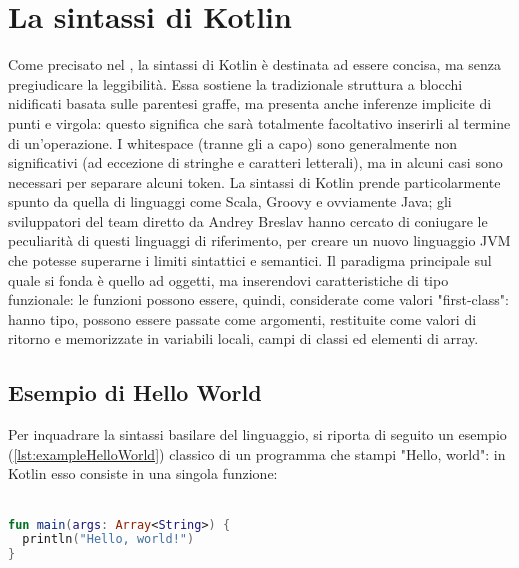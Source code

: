 
\chapter{La sintassi di Kotlin}\label{ch:sintassi}

Come precisato nel , la sintassi di Kotlin è destinata ad essere concisa, ma senza pregiudicare la leggibilità. Essa sostiene la tradizionale struttura a blocchi nidificati basata sulle parentesi graffe, ma presenta anche inferenze implicite di punti e virgola: questo significa che sarà totalmente facoltativo inserirli al termine di un'operazione. I whitespace (tranne gli a capo) sono generalmente non significativi (ad eccezione di stringhe e caratteri letterali), ma in alcuni casi sono necessari per separare alcuni token. La sintassi di Kotlin prende particolarmente spunto da quella di linguaggi come Scala, Groovy e ovviamente Java; gli sviluppatori del team diretto da Andrey Breslav hanno cercato di coniugare le peculiarità di questi linguaggi di riferimento, per creare un nuovo linguaggio JVM che potesse superarne i limiti sintattici e semantici. Il paradigma principale sul quale si fonda è quello ad oggetti, ma inserendovi caratteristiche di tipo funzionale: le funzioni possono essere, quindi, considerate come valori "first-class": hanno tipo, possono essere passate come argomenti, restituite come valori di ritorno e memorizzate in variabili locali, campi di classi ed elementi di array.\\

\section{Esempio di Hello World}
Per inquadrare la sintassi basilare del linguaggio, si riporta di seguito un esempio (\ref{lst:exampleHelloWorld}) classico di un programma che stampi "Hello, world": in Kotlin esso consiste in una singola funzione:\\
\\

\begin{lstlisting}[caption={Hello World}, captionpos=b, label={lst:exampleHelloWorld}, language=Kotlin]
fun main(args: Array<String>) {
  println("Hello, world!")
}
\end{lstlisting}

